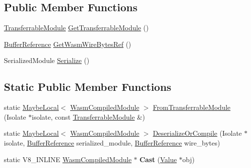 \subsection*{Public Member Functions}
\begin{DoxyCompactItemize}
\item 
\mbox{\hyperlink{classv8_1_1WasmCompiledModule_1_1TransferrableModule}{Transferrable\+Module}} \mbox{\hyperlink{classv8_1_1WasmCompiledModule_a5872dd7762bf1c1ebcef833d8356f6ad}{Get\+Transferrable\+Module}} ()
\item 
\mbox{\hyperlink{structv8_1_1WasmCompiledModule_1_1BufferReference}{Buffer\+Reference}} \mbox{\hyperlink{classv8_1_1WasmCompiledModule_ad889c2d766016ebf74b7093e8b210aa2}{Get\+Wasm\+Wire\+Bytes\+Ref}} ()
\item 
Serialized\+Module \mbox{\hyperlink{classv8_1_1WasmCompiledModule_a56ba174cfc319056ecdfc870e6c9d832}{Serialize}} ()
\end{DoxyCompactItemize}
\subsection*{Static Public Member Functions}
\begin{DoxyCompactItemize}
\item 
static \mbox{\hyperlink{classv8_1_1MaybeLocal}{Maybe\+Local}}$<$ \mbox{\hyperlink{classv8_1_1WasmCompiledModule}{Wasm\+Compiled\+Module}} $>$ \mbox{\hyperlink{classv8_1_1WasmCompiledModule_a6bdfdf09e75ad1eb19d5b944e6177f74}{From\+Transferrable\+Module}} (Isolate $\ast$isolate, const \mbox{\hyperlink{classv8_1_1WasmCompiledModule_1_1TransferrableModule}{Transferrable\+Module}} \&)
\item 
static \mbox{\hyperlink{classv8_1_1MaybeLocal}{Maybe\+Local}}$<$ \mbox{\hyperlink{classv8_1_1WasmCompiledModule}{Wasm\+Compiled\+Module}} $>$ \mbox{\hyperlink{classv8_1_1WasmCompiledModule_abd5b90ef1d021e148c2fcb052a8651d4}{Deserialize\+Or\+Compile}} (Isolate $\ast$isolate, \mbox{\hyperlink{structv8_1_1WasmCompiledModule_1_1BufferReference}{Buffer\+Reference}} serialized\+\_\+module, \mbox{\hyperlink{structv8_1_1WasmCompiledModule_1_1BufferReference}{Buffer\+Reference}} wire\+\_\+bytes)
\item 
\mbox{\label{classv8_1_1WasmCompiledModule_a6dace1927ba208e592a4dc67ccc8149c}} 
static V8\+\_\+\+I\+N\+L\+I\+NE \mbox{\hyperlink{classv8_1_1WasmCompiledModule}{Wasm\+Compiled\+Module}} $\ast$ {\bfseries Cast} (\mbox{\hyperlink{classv8_1_1Value}{Value}} $\ast$obj)
\end{DoxyCompactItemize}


